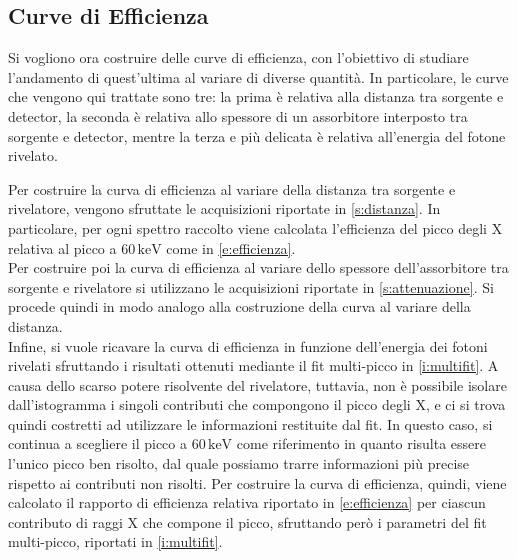 \documentclass[twocolumn,10pt]{asme2ej}
\begin{document}
\subsection{Curve di Efficienza}

Si vogliono ora costruire delle curve di efficienza, con l'obiettivo di studiare l'andamento di quest'ultima al variare
di diverse quantità. In particolare, le curve che vengono qui trattate sono tre: la prima è relativa alla distanza tra
sorgente e detector, la seconda è relativa allo spessore di un assorbitore interposto tra sorgente e detector, mentre la
terza e più delicata è relativa all'energia del fotone rivelato. 

Per costruire la curva di efficienza al variare della distanza tra sorgente e rivelatore, vengono sfruttate le
acquisizioni riportate in \autoref{s:distanza}. In particolare, per ogni spettro raccolto viene calcolata l'efficienza
del picco degli X relativa al picco a $60\,\si{\kilo\electronvolt}$ come in \autoref{e:efficienza}. \\
Per costruire poi la curva di efficienza al variare dello spessore dell'assorbitore tra sorgente e rivelatore si
utilizzano le acquisizioni riportate in \autoref{s:attenuazione}. Si procede quindi in modo analogo alla costruzione
della curva al variare della distanza. \\
Infine, si vuole ricavare la curva di efficienza in funzione dell'energia dei fotoni rivelati sfruttando  i risultati
ottenuti mediante il fit multi-picco in \autoref{i:multifit}. A causa dello scarso potere risolvente del rivelatore,
tuttavia, non è possibile isolare dall'istogramma i singoli contributi che compongono il picco degli X, e ci si trova
quindi costretti ad utilizzare le informazioni restituite dal fit. In questo caso, si continua a scegliere il picco a
$60\,\si{\kilo\electronvolt}$ come riferimento in quanto risulta essere l'unico picco ben risolto, dal quale possiamo
trarre informazioni più precise rispetto ai contributi non risolti. Per costruire la curva di efficienza, quindi, viene
calcolato il rapporto di efficienza relativa riportato in \autoref{e:efficienza} per ciascun contributo di raggi X che
compone il picco, sfruttando però i parametri del fit multi-picco, riportati in \autoref{i:multifit}. 
\end{document}
